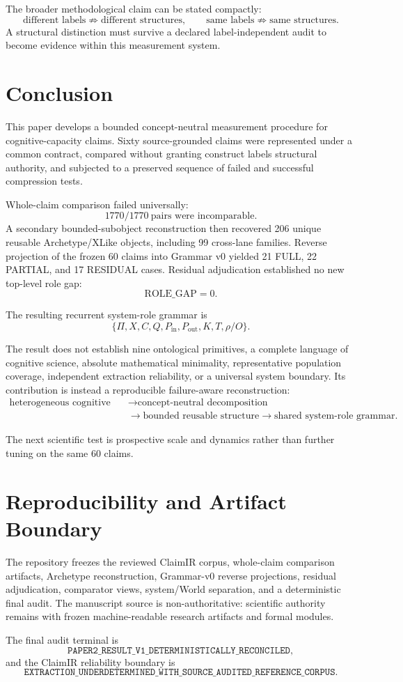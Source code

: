 \documentclass[11pt]{article}
\newcommand{\Pin}{P_{\mathrm{in}}}
\newcommand{\Pout}{P_{\mathrm{out}}}
\begin{document}
The broader methodological claim can be stated compactly:
\[
\text{different labels}\not\Rightarrow\text{different structures},
\qquad
\text{same labels}\not\Rightarrow\text{same structures}.
\]
A structural distinction must survive a declared label-independent audit to become evidence within this measurement system.

\section{Conclusion}

This paper develops a bounded concept-neutral measurement procedure for cognitive-capacity claims. Sixty source-grounded claims were represented under a common contract, compared without granting construct labels structural authority, and subjected to a preserved sequence of failed and successful compression tests.

Whole-claim comparison failed universally:
\[
1770/1770\ \text{pairs were incomparable}.
\]
A secondary bounded-subobject reconstruction then recovered 206 unique reusable Archetype/XLike objects, including 99 cross-lane families. Reverse projection of the frozen 60 claims into Grammar v0 yielded 21 FULL, 22 PARTIAL, and 17 RESIDUAL cases. Residual adjudication established no new top-level role gap:
\[
\mathrm{ROLE\_GAP}=0.
\]

The resulting recurrent system-role grammar is
\[
\boxed{\{\Pi,X,C,Q,\Pin,\Pout,K,T,\rho/O\}}.
\]

The result does not establish nine ontological primitives, a complete language of cognitive science, absolute mathematical minimality, representative population coverage, independent extraction reliability, or a universal system boundary. Its contribution is instead a reproducible failure-aware reconstruction:
\[
\begin{aligned}
\text{heterogeneous cognitive claims}
&\rightarrow
\text{concept-neutral decomposition}
\\
&\rightarrow
\text{bounded reusable structure}
\rightarrow
\text{shared system-role grammar}.
\end{aligned}
\]

The next scientific test is prospective scale and dynamics rather than further tuning on the same 60 claims.

\section*{Reproducibility and Artifact Boundary}

The repository freezes the reviewed ClaimIR corpus, whole-claim comparison artifacts, Archetype reconstruction, Grammar-v0 reverse projections, residual adjudication, comparator views, system/World separation, and a deterministic final audit. The manuscript source is non-authoritative: scientific authority remains with frozen machine-readable research artifacts and formal modules.

The final audit terminal is
\[
\texttt{PAPER2\_RESULT\_V1\_DETERMINISTICALLY\_RECONCILED},
\]
and the ClaimIR reliability boundary is
\[
\texttt{EXTRACTION\_UNDERDETERMINED\_WITH\_SOURCE\_AUDITED\_REFERENCE\_CORPUS}.
\]



\end{document}
